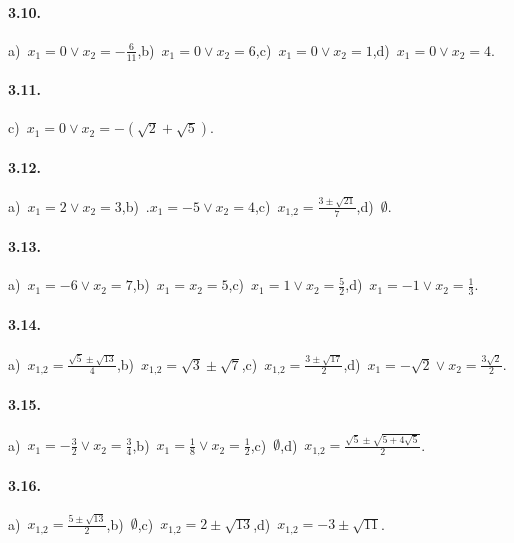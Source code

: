 \paragraph{3.10.} a)~$x_{1} = 0 \vee x_{2} = - \frac{6}{11}$,\quad b)~$x_{1} = 0 \vee x_{2} = 6$,\quad c)~$x_{1} = 0 \vee x_{2} = 1$,\quad d)~$x_{1} = 0 \vee x_{2} = 4$.

\paragraph{3.11.} c)~$x_{1} = 0 \vee x_{2} = - (\sqrt{2} + \sqrt{5})$.

\paragraph{3.12.} a)~$x_{1} = 2 \vee x_{2} = 3$,\quad b)~.$x_{1} =-5 \vee x_{2} = 4$,\quad c)~$x_{1\text{,}2} = \frac{3 \pm \sqrt{21}}{7}$,\quad d)~$\emptyset$.

\paragraph{3.13.} a)~$x_{1} =-6 \vee x_{2} = 7$,\quad b)~$x_{1} = x_{2} = 5$,\quad c)~$x_{1} = 1 \vee x_{2} = \frac{5}{2}$,\quad d)~$x_{1} =-1 \vee x_{2} = \frac{1}{3}$.

\paragraph{3.14.} a)~$x_{1\text{,}2} = \frac{\sqrt{5} \pm \sqrt{13}}{4}$,\quad b)~$x_{1\text{,}2} = \sqrt{3} \pm \sqrt{7}$,\quad c)~$x_{1\text{,}2} = \frac{3 \pm \sqrt{17}}{2}$,\quad d)~$x_{1} =-\sqrt{2} \vee x_{2} = \frac{3 \sqrt{2}}{2}$.

\paragraph{3.15.} a)~$x_{1} =-\frac{3}{2} \vee x_{2} = \frac{3}{4}$,\quad b)~$x_{1} = \frac{1}{8} \vee x_{2} = \frac{1}{2}$,\quad c)~$\emptyset$,\quad d)~$x_{1\text{,}2} = \frac{\sqrt{5} \pm \sqrt{5 + 4 \sqrt{5}}}{2}$.

\paragraph{3.16.} a)~$x_{1\text{,}2} = \frac{5 \pm \sqrt{13}}{2}$,\quad b)~$\emptyset$,\quad c)~$x_{1\text{,}2} = 2 \pm \sqrt{13}$,\quad d)~$x_{1\text{,}2} =-3 \pm \sqrt{11}$.

